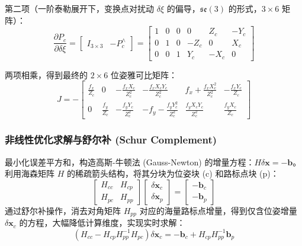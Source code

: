 \documentclass[12pt,a4paper]{article}
\begin{document}
第二项（一阶泰勒展开下，变换点对扰动 $\delta \xi$ 的偏导，$\mathfrak{se}(3)$ 的形式，$3 \times 6$ 矩阵）：
\begin{equation}
    \frac{\partial P_c}{\partial \delta \xi} = 
    \begin{bmatrix} 
        I_{3 \times 3} & -P_c^{\wedge} 
    \end{bmatrix} =
    \begin{bmatrix}
        1 & 0 & 0 & 0 & Z_c & -Y_c \\
        0 & 1 & 0 & -Z_c & 0 & X_c \\
        0 & 0 & 1 & Y_c & -X_c & 0
    \end{bmatrix}
\end{equation}

两项相乘，得到最终的 $2 \times 6$ 位姿雅可比矩阵：
\begin{equation}
    J = -
    \begin{bmatrix} 
        \frac{f_x}{Z_c} & 0 & -\frac{f_x X_c}{Z_c^2} & -\frac{f_x X_c Y_c}{Z_c^2} & f_x + \frac{f_x X_c^2}{Z_c^2} & -\frac{f_x Y_c}{Z_c} \\ 
        0 & \frac{f_y}{Z_c} & -\frac{f_y Y_c}{Z_c^2} & -f_y - \frac{f_y Y_c^2}{Z_c^2} & \frac{f_y X_c Y_c}{Z_c^2} & \frac{f_y X_c}{Z_c} 
    \end{bmatrix}
\end{equation}

\subsubsection{非线性优化求解与舒尔补 (Schur Complement)}
最小化误差平方和，构造高斯-牛顿法 (Gauss-Newton) 的增量方程：$H \delta \mathbf{x} = - \mathbf{b}$。
利用海森矩阵 $H$ 的稀疏箭头结构，将其分块为位姿块 (c) 和路标点块 (p)：
\begin{equation}
    \begin{bmatrix} 
        H_{cc} & H_{cp} \\ 
        H_{pc} & H_{pp} 
    \end{bmatrix} 
    \begin{bmatrix} 
        \delta \mathbf{x}_c \\ 
        \delta \mathbf{x}_p 
    \end{bmatrix} = 
    \begin{bmatrix} 
        -\mathbf{b}_c \\ 
        -\mathbf{b}_p 
    \end{bmatrix}
\end{equation}
通过舒尔补操作，消去对角矩阵 $H_{pp}$ 对应的海量路标点增量，得到仅含位姿增量 $\delta \mathbf{x}_c$ 的方程，大幅降低计算维度，实现实时求解：
\begin{equation}
    (H_{cc} - H_{cp} H_{pp}^{-1} H_{pc}) \delta \mathbf{x}_c = -\mathbf{b}_c + H_{cp} H_{pp}^{-1} \mathbf{b}_p
\end{equation}
\end{document}
